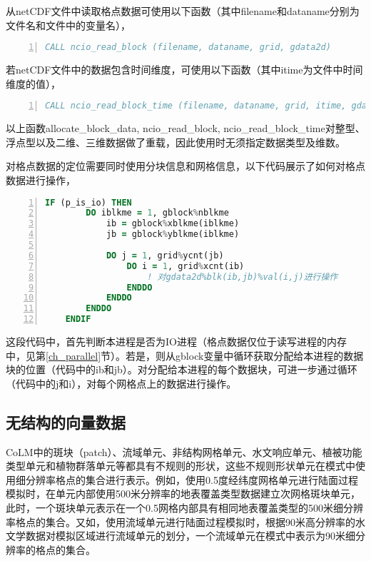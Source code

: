 从netCDF文件中读取格点数据可使用以下函数（其中filename和dataname分别为文件名和文件中的变量名），
\begin{lstlisting}[language=fortran, basicstyle=\linespread{1.0}\footnotesize\ttfamily, commentstyle=\color{black}, numbers=left, numberstyle=\tiny, xleftmargin=1.5em,xrightmargin=0em, aboveskip=1em]
   CALL ncio_read_block (filename, dataname, grid, gdata2d)
\end{lstlisting}

若netCDF文件中的数据包含时间维度，可使用以下函数（其中itime为文件中时间维度的值），
\begin{lstlisting}[language=fortran, basicstyle=\linespread{1.0}\footnotesize\ttfamily, commentstyle=\color{black}, numbers=left, numberstyle=\tiny, xleftmargin=1.5em,xrightmargin=0em, aboveskip=1em]
   CALL ncio_read_block_time (filename, dataname, grid, itime, gdata2d)
\end{lstlisting}

以上函数allocate\_block\_data, ncio\_read\_block, ncio\_read\_block\_time对整型、浮点型以及二维、三维数据做了重载，因此使用时无须指定数据类型及维数。

对格点数据的定位需要同时使用分块信息和网格信息，以下代码展示了如何对格点数据进行操作，
\begin{lstlisting}[language=fortran, basicstyle=\linespread{1.0}\footnotesize\ttfamily, commentstyle=\color{black}, numbers=left, numberstyle=\tiny, xleftmargin=1.5em,xrightmargin=0em, aboveskip=1em]
    IF (p_is_io) THEN
        DO iblkme = 1, gblock%nblkme
            ib = gblock%xblkme(iblkme)
            jb = gblock%yblkme(iblkme)

            DO j = 1, grid%ycnt(jb)
                DO i = 1, grid%xcnt(ib)
                    ! 对gdata2d%blk(ib,jb)%val(i,j)进行操作
                ENDDO
            ENDDO
        ENDDO
    ENDIF
\end{lstlisting}
这段代码中，首先判断本进程是否为IO进程（格点数据仅位于读写进程的内存中，见第\ref{ch_parallel}节）。若是，则从gblock变量中循环获取分配给本进程的数据块的位置（代码中的ib和jb）。对分配给本进程的每个数据块，可进一步通过循环（代码中的j和i），对每个网格点上的数据进行操作。

\subsection{无结构的向量数据}

CoLM中的斑块（patch）、流域单元、非结构网格单元、水文响应单元、植被功能类型单元和植物群落单元等都具有不规则的形状，这些不规则形状单元在模式中使用细分辨率格点的集合进行表示。例如，使用0.5\textdegree 度经纬度网格单元进行陆面过程模拟时，在单元内部使用500米分辨率的地表覆盖类型数据建立次网格斑块单元，此时，一个斑块单元表示在一个0.5\textdegree 网格内部具有相同地表覆盖类型的500米细分辨率格点的集合。又如，使用流域单元进行陆面过程模拟时，根据90米高分辨率的水文学数据对模拟区域进行流域单元的划分，一个流域单元在模式中表示为90米细分辨率的格点的集合。

